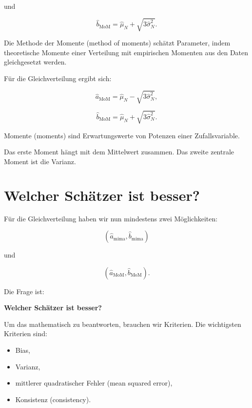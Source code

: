 und

\[
    \hat{b}_{\mathrm{MoM}}
    =
    \hat{\mu}_N
    +
    \sqrt{3\hat{\sigma}^2_N}.
\]

\begin{definitionbox}
Die Methode der Momente (method of moments) schätzt Parameter, indem theoretische Momente einer Verteilung mit empirischen Momenten aus den Daten gleichgesetzt werden.

Für die Gleichverteilung ergibt sich:

\[
    \hat{a}_{\mathrm{MoM}}
    =
    \hat{\mu}_N
    -
    \sqrt{3\hat{\sigma}^2_N},
\]

\[
    \hat{b}_{\mathrm{MoM}}
    =
    \hat{\mu}_N
    +
    \sqrt{3\hat{\sigma}^2_N}.
\]
\end{definitionbox}

\begin{notebox}
Momente (moments) sind Erwartungswerte von Potenzen einer Zufallsvariable.

Das erste Moment hängt mit dem Mittelwert zusammen.
Das zweite zentrale Moment ist die Varianz.
\end{notebox}

\section{Welcher Schätzer ist besser?}

Für die Gleichverteilung haben wir nun mindestens zwei Möglichkeiten:

\[
    (\hat{a}_{\mathrm{mima}},\hat{b}_{\mathrm{mima}})
\]

und

\[
    (\hat{a}_{\mathrm{MoM}},\hat{b}_{\mathrm{MoM}}).
\]

Die Frage ist:

\begin{center}
\textbf{Welcher Schätzer ist besser?}
\end{center}

Um das mathematisch zu beantworten, brauchen wir Kriterien.
Die wichtigsten Kriterien sind:

\begin{itemize}
    \item Bias,
    \item Varianz,
    \item mittlerer quadratischer Fehler (mean squared error),
    \item Konsistenz (consistency).
\end{itemize}

